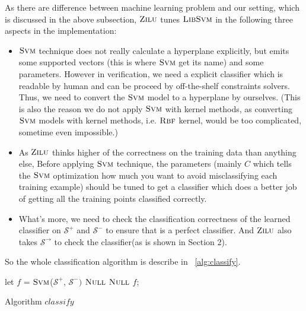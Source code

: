 As there are difference between machine learning problem and our setting, which is discussed in the above subsection,
$\textsc{Zilu}$ tunes $\textsc{LibSvm}$ in the following three aspects in the implementation: 
\begin{itemize}
\item $\textsc{Svm}$ technique does not really calculate a hyperplane explicitly, 
but emits some supported vectors (this is where $\textsc{Svm}$ get its name) and some parameters.
However in verification, we need a explicit classifier which is readable by human and can be proceed by off-the-shelf constraints solvers.
Thus, we need to convert the $\textsc{Svm}$ model to a hyperplane by ourselves.
(This is also the reason we do not apply $\textsc{Svm}$ with kernel methods,
as converting $\textsc{Svm}$ models with kernel methods, i.e. $\textsc{Rbf}$ kernel, would be too complicated, sometime even impossible.)
\item As $\textsc{Zilu}$ thinks higher of the correctness on the training data than anything else,
Before applying $\textsc{Svm}$ technique, the parameters (mainly $C$ which tells the $\textsc{Svm}$ optimization how much you want to avoid misclassifying each training example)
should be tuned to get a classifier which does a better job of getting all the training points classified correctly.
\item What's more, we need to check the classification correctness of the learned classifier 
on $\mathcal{S}^+$ and $\mathcal{S}^-$ to ensure that is a perfect classifier.
And $\textsc{Zilu}$ also takes $\mathcal{S}^\rightarrow$ to check the classifier(as is shown in Section 2).
\end{itemize} 

So the whole classification algorithm is describe in ~\ref{alg:classify}.

\begin{algorithm}[t]
\SetAlgoVlined
\Indm
{}
\Indp
    let $f$ = $\textsc{Svm}$($\mathcal{S}^+$, $\mathcal{S}^-)$\;
     {
    	\Return $\textsc{Null}$\;
    }
	 {
	    \Return $\textsc{Null}$\;
    }
    \Return $f$;
\caption{Algorithm $classify$}
\label{alg:classify}
\end{algorithm}

